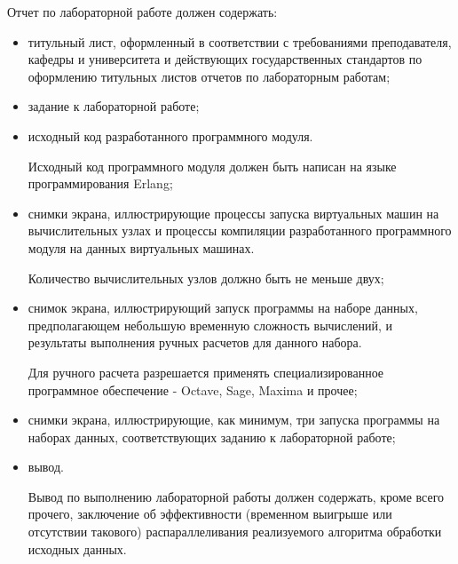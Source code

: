 
Отчет по лабораторной работе должен содержать:

\begin{itemize}

	\item титульный лист, оформленный в соответствии с требованиями преподавателя, кафедры и университета и действующих государственных стандартов по оформлению титульных листов отчетов по лабораторным работам;
	
	\item задание к лабораторной работе;

	\item исходный код разработанного программного модуля.

	Исходный код программного модуля должен быть написан на языке программирования Erlang;

	\item снимки экрана, иллюстрирующие процессы запуска виртуальных машин на вычислительных узлах и процессы компиляции разработанного программного модуля на данных виртуальных машинах.

	Количество вычислительных узлов должно быть не меньше двух;

	\item снимок экрана, иллюстрирующий запуск программы на наборе данных, предполагающем небольшую временную сложность вычислений, и результаты выполнения ручных расчетов для данного набора.

	Для ручного расчета разрешается применять специализированное программное обеспечение - Octave, Sage, Maxima и прочее;

	\item снимки экрана, иллюстрирующие, как минимум, три запуска программы на наборах данных, соответствующих заданию к лабораторной работе;

	\item вывод.

	Вывод по выполнению лабораторной работы должен содержать, кроме всего прочего, заключение об эффективности (временном выигрыше или отсутствии такового) распараллеливания реализуемого алгоритма обработки исходных данных.

\end{itemize}

